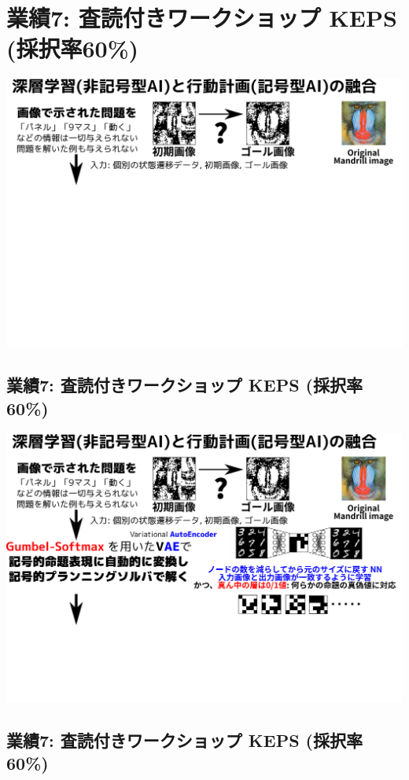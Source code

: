 \section{業績7: 査読付きワークショップ KEPS (採択率60\%)}
\label{sec:orgheadline43}

\includegraphics{img/keps17-1a.png}

\subsection{業績7: 査読付きワークショップ KEPS (採択率60\%)}
\label{sec:orgheadline38}

\includegraphics{img/keps17-1b.png}

\subsection{業績7: 査読付きワークショップ KEPS (採択率60\%)}
\label{sec:orgheadline39}


